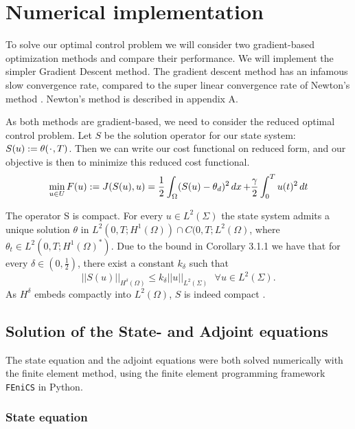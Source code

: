 
\section{Numerical implementation}

To solve our optimal control problem we will consider two gradient-based optimization methods and compare their performance. We will implement the simpler Gradient Descent method. The gradient descent method has an infamous slow convergence rate, compared to the super linear convergence rate of Newton's method \cite{Algorithms}. Newton's method is described in appendix A.

As both methods are gradient-based, we need to consider the reduced optimal control problem. Let $S$ be the solution operator for our state system:  $S(u):=\theta(\placeholder ,T)$. Then we can write our cost functional on reduced form, and our objective is then to minimize this reduced cost functional.
\begin{equation}
\label{eq:optimization_prob}
    \min_{u \in U}F(u) := J(S(u),u) = \frac{1}{2}\int_{\Omega}(S(u) - \theta_d)^2 \mathop{dx}+ \frac{\gamma}{2}\int_0^Tu(t)^2\mathop{dt}
\end{equation}

The operator S is compact. For every $u \in L^2(\Sigma)$ the state system admits a unique solution $\theta \text{ in } L^2(0,T;H^1(\Omega)) \cap C(0,T;L^2(\Omega)$, where $\theta_t \in L^2(0,T;H^1(\Omega)^{*})$. Due to the bound in Corollary 3.1.1 we have that for every $\delta \in (0,\frac{1}{2})$, there exist a constant $k_{\delta}$ such that 
\begin{equation*}
    ||S(u)||_{H^{\delta}(\Omega)} \leq k_{\delta}||u||_{L^2(\Sigma)} \text{ } \forall u \in L^2(\Sigma).
\end{equation*}
As $H^{\delta}$ embeds compactly into $L^2(\Omega)$, $S$ is indeed compact \cite{primal_dual}. 


\subsection{Solution of the State- and Adjoint equations}

The state equation and the adjoint equations were both solved numerically with the finite element method, using the finite element programming framework \verb|FEniCS| \cite{fenics} in Python.


\subsubsection{State equation}

